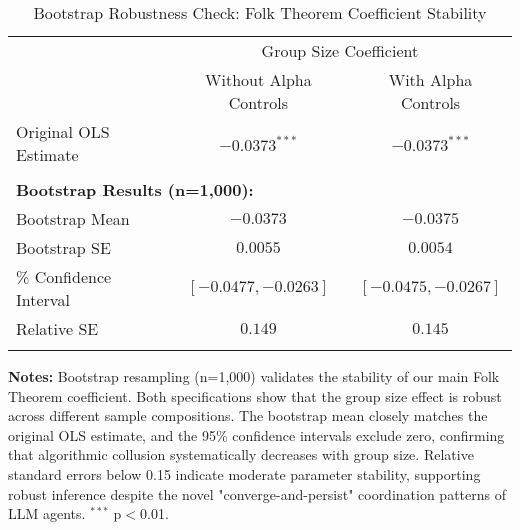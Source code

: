 \begin{table}[H]
    \centering
    \caption{Bootstrap Robustness Check: Folk Theorem Coefficient Stability}
    \label{tab:bootstrap_robustness}
    \begin{threeparttable}
    \begin{tabular}{lcc}
    \toprule
     & \multicolumn{2}{c}{Group Size Coefficient} \\
    \cmidrule(lr){2-3}
     & Without Alpha Controls & With Alpha Controls \\
    \midrule
    Original OLS Estimate & $-0.0373^{***}$ & $-0.0373^{***}$ \\
    \\
    \multicolumn{3}{l}{\textbf{Bootstrap Results (n=1,000):}} \\
    \quad Bootstrap Mean & $-0.0373$ & $-0.0375$ \\
    \quad Bootstrap SE & $0.0055$ & $0.0054$ \\
    \quad 95\% Confidence Interval & $[-0.0477, -0.0263]$ & $[-0.0475, -0.0267]$ \\
    \quad Relative SE & $0.149$ & $0.145$ \\
    \\
    \bottomrule
    \end{tabular}
    \begin{tablenotes}[flushleft]
    \footnotesize
    \item \textbf{Notes:} Bootstrap resampling (n=1,000) validates the stability of our main Folk Theorem coefficient. Both specifications show that the group size effect is robust across different sample compositions. The bootstrap mean closely matches the original OLS estimate, and the 95\% confidence intervals exclude zero, confirming that algorithmic collusion systematically decreases with group size. Relative standard errors below 0.15 indicate moderate parameter stability, supporting robust inference despite the novel "converge-and-persist" coordination patterns of LLM agents. $^{***}$ p$<$0.01.
    \end{tablenotes}
    \end{threeparttable}
\end{table}